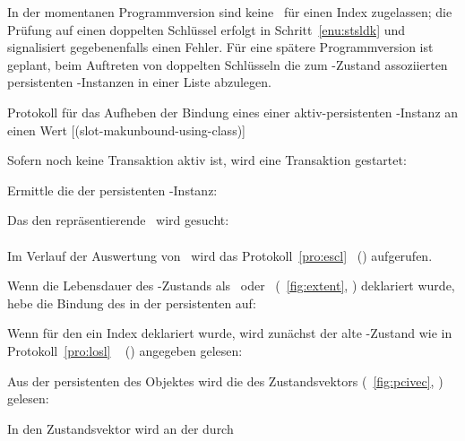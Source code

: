 %
In der momentanen Programmversion sind keine \ f\"{u}r einen Index zugelassen; die Pr\"{u}fung
auf einen doppelten Schl\"{u}ssel erfolgt in Schritt~\ref{enu:stsldk} und
signalisiert gegebenenfalls einen Fehler. F\"{u}r eine sp\"{a}tere
Programmversion ist geplant, beim Auftreten von doppelten Schl\"{u}sseln
die zum \Slt\/-Zustand assoziierten persistenten \clos-Instanzen in
einer Liste abzulegen.
%
\begin{infol}
%
\acaption%
 {{Protokoll f\"{u}r das Aufheben der Bindung eines
   \protect\Slt[s]\/ einer ak\-tiv-per\-si\-sten\-ten
   \clos-Instanz an einen Wert}}%
 [(slot-makunbound-using-class)]%
 \label{pro:musl}%
%
\item\label{enu:musltr} Sofern noch keine Transaktion aktiv ist, wird
eine Transaktion gestartet:\\
%
\item Ermittle die \sobjid\/ der persistenten \clos-Instanz:\\
%
\item Das den \Slt\/ repr\"{a}sentierende \sltdo\ wird gesucht:\\
\\
Im Verlauf der Auswertung von
\ wird das
Protokoll~\ref{pro:escl}
\stfn{\enscldescr}\ (\citepage{\pageref{pro:escl}}) aufgerufen.
%
\item Wenn die Lebensdauer des \Slt\/-Zustands als
\ oder
\ (\figurename~\ref{fig:extent},
\citepage{\pageref{fig:extent}}) deklariert wurde, hebe die
Bindung des \Slt[s]\/ in der persistenten \representation{} auf:
%
\begin{block}
%
\item\label{enu:muslov} Wenn f\"{u}r den \Slt\/ ein Index deklariert
wurde, wird zun\"{a}chst der alte \Slt\/-Zustand wie in
Protokoll~\ref{pro:losl} \ %
(\citepage{\pageref{pro:losl}}) angegeben gelesen:\\
%
\item Aus der persistenten \representation{} des Objektes wird die
\sobjid\/ des Zustandsvektors (\figurename~\ref{fig:pcivec},
\citepage{\pageref{fig:pcivec}}) gelesen:\\
%
\item In den Zustandsvektor wird an der durch

\end{block}
\end{infol}
